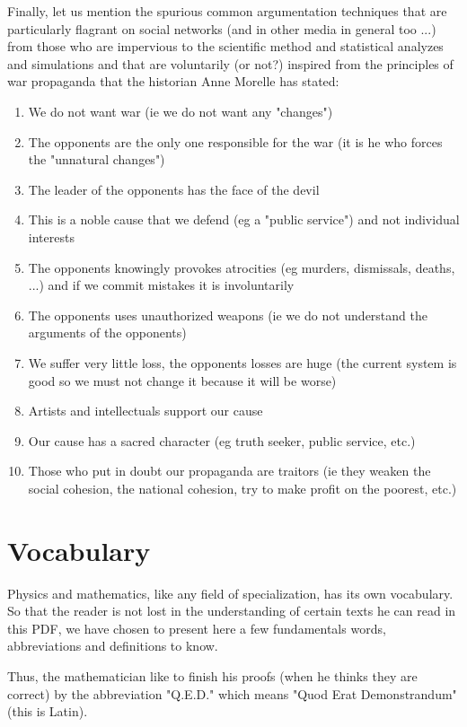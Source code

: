 	\pagebreak
	Finally, let us mention the spurious common argumentation techniques that are particularly flagrant on social networks (and in other media in general too ...) from those who are impervious to the scientific method and statistical analyzes and simulations and that are voluntarily (or not?) inspired from the principles of war propaganda that the historian Anne Morelle has stated:
	\begin{enumerate}
		\item We do not want war (ie we do not want any "changes")
		\item The opponents are the only one responsible for the war (it is he who forces the "unnatural changes")
		\item The leader of the opponents has the face of the devil
		\item This is a noble cause that we defend (eg a "public service") and not individual interests
		\item The opponents knowingly provokes atrocities (eg murders, dismissals, deaths, ...) and if we commit mistakes it is involuntarily
		\item The opponents uses unauthorized weapons (ie we do not understand the arguments of the opponents)
		\item We suffer very little loss, the opponents losses are huge (the current system is good so we must not change it because it will be worse)
		\item Artists and intellectuals support our cause
		\item Our cause has a sacred character (eg truth seeker, public service, etc.)
		\item Those who put in doubt our propaganda are traitors (ie they weaken the social cohesion, the national cohesion, try to make profit on the poorest, etc.)
	\end{enumerate}

	\newpage
	\thispagestyle{empty}
	\mbox{}
	\section{Vocabulary}
	Physics and mathematics, like any field of specialization, has its own vocabulary. So that the reader is not lost in the understanding of certain texts he can read in this PDF, we have chosen to present here a few fundamentals words, abbreviations and definitions to know.
	
	Thus, the mathematician like to finish his proofs (when he thinks they are correct) by the abbreviation "Q.E.D." which means "Quod Erat Demonstrandum" (this is Latin).
	
